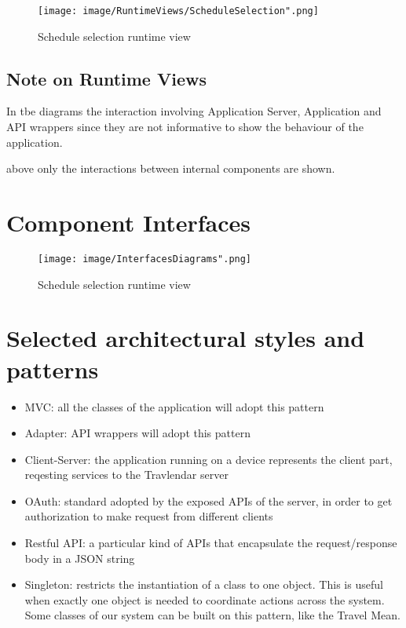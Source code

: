 
\begin{figure}[H]
\begin{center}
\texttt{[image: image/RuntimeViews/ScheduleSelection".png]}
\caption{Schedule selection runtime view}
\end{center}
\end{figure}

\subsection{Note on Runtime Views}
In tbe diagrams the interaction involving Application Server, Application and API wrappers since they are not informative to show the behaviour of the application.

above only the interactions between internal components are shown.

\section{Component Interfaces}
\begin{figure}[H]
\begin{center}
\texttt{[image: image/InterfacesDiagrams".png]}
\caption{Schedule selection runtime view}
\end{center}
\end{figure}


\section{Selected architectural styles and patterns}

\begin{itemize}
\item MVC: all the classes of the application will adopt this pattern
\item Adapter: API wrappers will adopt this pattern
\item Client-Server: the application  running on a device represents the client part, reqesting services to the Travlendar server
\item OAuth: standard adopted by the exposed APIs of the server, in order to get authorization to make request from different clients
\item Restful API: a particular kind of APIs that encapsulate the request/response body in a JSON string
\item Singleton: restricts the instantiation of a class to one object. This is useful when exactly one object is needed to coordinate actions across the system. Some classes of our system can be built on this pattern, like the Travel Mean.
\end{itemize}


